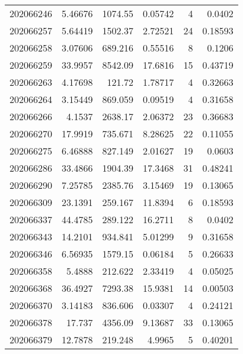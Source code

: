 \begin{tabular}{rrrrrr}
 202066246 &          5.46676 &     1074.55   &            0.05742 &           4 & 0.0402  \\
 202066257 &          5.64419 &     1502.37   &            2.72521 &          24 & 0.18593 \\
 202066258 &          3.07606 &      689.216  &            0.55516 &           8 & 0.1206  \\
 202066259 &         33.9957  &     8542.09   &           17.6816  &          15 & 0.43719 \\
 202066263 &          4.17698 &      121.72   &            1.78717 &           4 & 0.32663 \\
 202066264 &          3.15449 &      869.059  &            0.09519 &           4 & 0.31658 \\
 202066266 &          4.1537  &     2638.17   &            2.06372 &          23 & 0.36683 \\
 202066270 &         17.9919  &      735.671  &            8.28625 &          22 & 0.11055 \\
 202066275 &          6.46888 &      827.149  &            2.01627 &          19 & 0.0603  \\
 202066286 &         33.4866  &     1904.39   &           17.3468  &          31 & 0.48241 \\
 202066290 &          7.25785 &     2385.76   &            3.15469 &          19 & 0.13065 \\
 202066309 &         23.1391  &      259.167  &           11.8394  &           6 & 0.18593 \\
 202066337 &         44.4785  &      289.122  &           16.2711  &           8 & 0.0402  \\
 202066343 &         14.2101  &      934.841  &            5.01299 &           9 & 0.31658 \\
 202066346 &          6.56935 &     1579.15   &            0.06184 &           5 & 0.26633 \\
 202066358 &          5.4888  &      212.622  &            2.33419 &           4 & 0.05025 \\
 202066368 &         36.4927  &     7293.38   &           15.9381  &          14 & 0.00503 \\
 202066370 &          3.14183 &      836.606  &            0.03307 &           4 & 0.24121 \\
 202066378 &         17.737   &     4356.09   &            9.13687 &          33 & 0.13065 \\
 202066379 &         12.7878  &      219.248  &            4.9965  &           5 & 0.40201 \\

\end{tabular}
